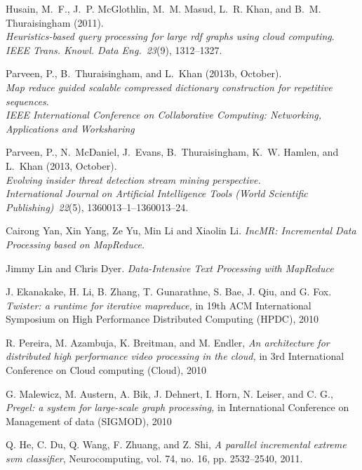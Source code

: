 \documentclass[conference]{IEEEtran}
\begin{document}
\begin{thebibliography}{1}
Husain, M.~F., J.~P. McGlothlin, M.~M. Masud, L.~R. Khan, and B.~M. Thuraisingham (2011).\\
\textit{Heuristics-based query processing for large rdf graphs using cloud computing}.\\
\textit{IEEE Trans. Knowl. Data Eng.\/}~\textit{23\/}(9), 1312--1327.

Parveen, P., B.~Thuraisingham, and L.~Khan (2013b, October).\\
\textit{Map reduce guided scalable compressed dictionary construction for repetitive sequences.}\\
\textit{IEEE International Conference on Collaborative Computing: Networking, Applications and Worksharing}

Parveen, P., N.~McDaniel, J.~Evans, B.~Thuraisingham, K.~W. Hamlen, and L.~Khan (2013, October).\\
\textit{Evolving insider threat detection stream mining perspective.}\\
{\em International Journal on Artificial Intelligence Tools (World Scientific Publishing)\/}~{\em 22\/}(5), 1360013--1--1360013--24.

Cairong Yan, Xin Yang, Ze Yu, Min Li and Xiaolin Li. \textit{IncMR: Incremental Data Processing based on MapReduce.}

Jimmy Lin and Chris Dyer. \textit{Data-Intensive Text Processing with MapReduce}

J. Ekanakake, H. Li, B. Zhang, T. Gunarathne, S. Bae, J. Qiu, and G. Fox. \textit{Twister: a runtime for iterative mapreduce,} in 19th ACM International Symposium on High Performance Distributed Computing
(HPDC), 2010

R. Pereira, M. Azambuja, K. Breitman, and M. Endler, \textit{An architecture for distributed high performance video processing in the cloud,} in 3rd International Conference on Cloud computing (Cloud), 2010

G. Malewicz, M. Austern, A. Bik, J. Dehnert, I. Horn, N. Leiser, and C. G., \textit{Pregel: a system for large-scale graph processing,} in International Conference on Management of data (SIGMOD), 2010

Q. He, C. Du, Q. Wang, F. Zhuang, and Z. Shi, \textit{A parallel incremental extreme svm classifier}, Neurocomputing, vol. 74, no. 16, pp. 2532–2540, 2011.

\end{thebibliography}



\end{document}
